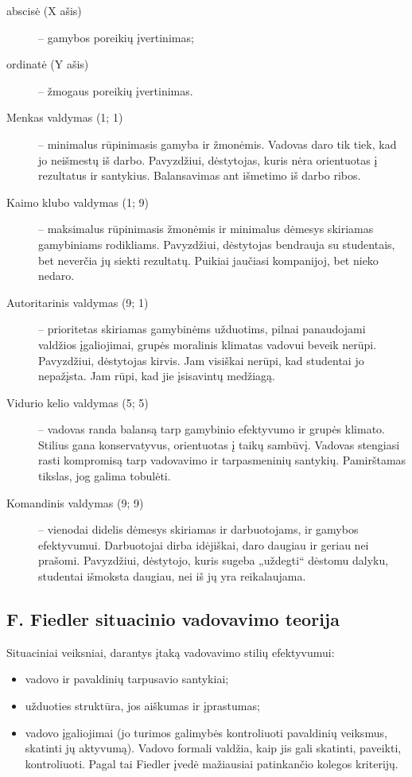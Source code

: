 \begin{description}
  \item[abscisė (X ašis)] – gamybos poreikių įvertinimas;
  \item[ordinatė (Y ašis)] – žmogaus poreikių įvertinimas.
\end{description}

\begin{description}
  \item[Menkas valdymas (1; 1)] – minimalus rūpinimasis gamyba ir žmonėmis.
    Vadovas daro tik tiek, kad jo neišmestų iš darbo. Pavyzdžiui,
    dėstytojas, kuris nėra orientuotas į rezultatus ir santykius.
    Balansavimas ant išmetimo iš darbo ribos.
  \item[Kaimo klubo valdymas (1; 9)] – maksimalus rūpinimasis žmonėmis
    ir minimalus dėmesys skiriamas gamybiniams rodikliams. Pavyzdžiui,
    dėstytojas bendrauja su studentais, bet neverčia jų siekti
    rezultatų. Puikiai jaučiasi kompanijoj, bet nieko nedaro.
  \item[Autoritarinis valdymas (9; 1)] – prioritetas skiriamas gamybinėms
    užduotims, pilnai panaudojami valdžios įgaliojimai, grupės moralinis
    klimatas vadovui beveik nerūpi. Pavyzdžiui, dėstytojas kirvis.
    Jam visiškai nerūpi, kad studentai jo nepažįsta. Jam rūpi, kad jie
    įsisavintų medžiagą.
  \item[Vidurio kelio valdymas (5; 5)] – vadovas randa balansą tarp
    gamybinio efektyvumo ir grupės klimato. Stilius gana konservatyvus,
    orientuotas į taikų sambūvį. Vadovas stengiasi rasti kompromisą
    tarp vadovavimo ir tarpasmeninių santykių. Pamirštamas tikslas,
    jog galima tobulėti.
  \item[Komandinis valdymas (9; 9)] – vienodai didelis dėmesys skiriamas
    ir darbuotojams, ir gamybos efektyvumui. Darbuotojai dirba idėjiškai,
    daro daugiau ir geriau nei prašomi. Pavyzdžiui, dėstytojo, kuris
    sugeba „uždegti“ dėstomu dalyku, studentai išmoksta daugiau, nei
    iš jų yra reikalaujama.
\end{description}

\subsection{F. Fiedler situacinio vadovavimo teorija}

Situaciniai veiksniai, darantys įtaką vadovavimo stilių efektyvumui:
\begin{itemize}
  \item vadovo ir pavaldinių tarpusavio santykiai;
  \item užduoties struktūra, jos aiškumas ir įprastumas;
  \item vadovo įgaliojimai (jo turimos galimybės kontroliuoti pavaldinių
    veiksmus, skatinti jų aktyvumą). Vadovo formali valdžia, kaip jis
    gali skatinti, paveikti, kontroliuoti. Pagal tai Fiedler įvedė
    mažiausiai patinkančio kolegos kriterijų.
\end{itemize}

